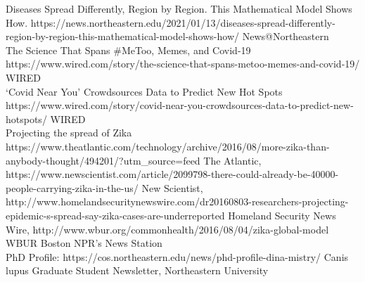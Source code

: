 

\begin{cvletter}

\cvmedia
{Diseases Spread Differently, Region by Region. This Mathematical Model Shows How.}
{https://news.northeastern.edu/2021/01/13/diseases-spread-differently-region-by-region-this-mathematical-model-shows-how/}
{News@Northeastern}
\\
\cvmedia
{The Science That Spans #MeToo, Memes, and Covid-19}
{https://www.wired.com/story/the-science-that-spans-metoo-memes-and-covid-19/}
{WIRED}
\\
\cvmedia
{‘Covid Near You’ Crowdsources Data to Predict New Hot Spots}
{https://www.wired.com/story/covid-near-you-crowdsources-data-to-predict-new-hotspots/}
{WIRED}
\\
\cvmedia
{Projecting the spread of Zika}
{https://www.theatlantic.com/technology/archive/2016/08/more-zika-than-anybody-thought/494201/?utm_source=feed}
{The Atlantic,}
\cvmedia
{}
{https://www.newscientist.com/article/2099798-there-could-already-be-40000-people-carrying-zika-in-the-us/}
{New Scientist,}
\cvmedia
{}
{http://www.homelandsecuritynewswire.com/dr20160803-researchers-projecting-epidemic-s-spread-say-zika-cases-are-underreported}
{Homeland Security News Wire,}
\cvmedia
{}
{http://www.wbur.org/commonhealth/2016/08/04/zika-global-model}
{WBUR Boston NPR's News Station}
\\
\cvmedia
{PhD Profile:}
{https://cos.northeastern.edu/news/phd-profile-dina-mistry/}
{Canis lupus Graduate Student Newsletter, Northeastern University}
\end{cvletter}